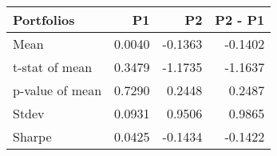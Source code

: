 \begin{tabular}{lrrr}
\toprule
Portfolios & P1 & P2 & P2 - P1 \\
\midrule
Mean & 0.0040 & -0.1363 & -0.1402 \\
t-stat of mean & 0.3479 & -1.1735 & -1.1637 \\
p-value of mean & 0.7290 & 0.2448 & 0.2487 \\
Stdev & 0.0931 & 0.9506 & 0.9865 \\
Sharpe & 0.0425 & -0.1434 & -0.1422 \\
\bottomrule
\end{tabular}
